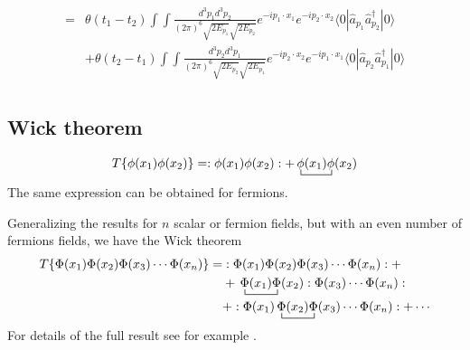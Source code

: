 \begin{align}
=&\theta(t_1-t_2)\int\int\frac{d^3p_1d^3p_2}{(2\pi)^6\sqrt{2E_{p_1}}\sqrt{2E_{p_2}}}e^{-i p_1\cdot x_1}e^{-i p_2\cdot x_2}
\langle0|\hat{a}_{p_1}\hat{a}_{p_2}^\dagger|0\rangle\nonumber\\
&+\theta(t_2-t_1)\int\int\frac{d^3p_2d^3p_1}{(2\pi)^6\sqrt{2E_{p_2}}\sqrt{2E_{p_1}}}e^{-i p_2\cdot x_2}e^{-i p_1\cdot x_1}
\langle0|\hat{a}_{p_2}\hat{a}_{p_1}^\dagger|0\rangle\nonumber\\
\end{align}

  

\subsection{Wick theorem}
\begin{align}
  T\{\phi(x_1)\phi(x_2)\}=:\phi(x_1)\phi(x_2):+\bcontraction{\,}{\phi}{(x_1)}{\phi}
\,\phi(x_1)\phi(x_2)
\end{align}
The same expression can be obtained for fermions.

  


 Generalizing  the results for $n$ scalar or fermion fields, but with an even number of fermions fields, we have the Wick theorem
\begin{align}
  T\{\Phi(x_1)\Phi(x_2)\Phi(x_3)\cdots\Phi(x_n) \}
=&:\Phi(x_1)\Phi(x_2)\Phi(x_3)\cdots\Phi(x_n):+\nonumber\\
&+\bcontraction{\,}{\Phi}{(x_1)}{\Phi}\,\Phi(x_1)\Phi(x_2):\Phi(x_3)\cdots\Phi(x_n):\nonumber\\
&+:\Phi(x_1)\bcontraction{\,}{\Phi}{(x_2)}{\Phi}\,\Phi(x_2)\Phi(x_3)\cdots\Phi(x_n):+\cdots 
\end{align}
For details of the full result see for example \cite{Lahiri:2005sm}.



